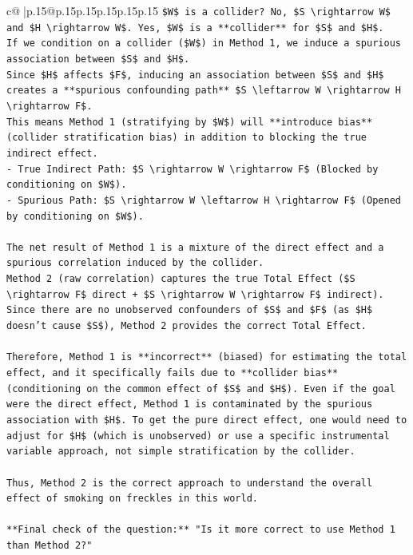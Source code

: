 \documentclass{article}
\begin{document}
{\begin{supertabular}{c@{$\;$}|p{.15\linewidth}@{}p{.15\linewidth}p{.15\linewidth}p{.15\linewidth}p{.15\linewidth}p{.15\linewidth}}
{{{\texttt{\$W\$ is a collider? No, \$S \textbackslash{}rightarrow W\$ and \$H \textbackslash{}rightarrow W\$. Yes, \$W\$ is a **collider** for \$S\$ and \$H\$.} \\
\texttt{If we condition on a collider (\$W\$) in Method 1, we induce a spurious association between \$S\$ and \$H\$.} \\
\texttt{Since \$H\$ affects \$F\$, inducing an association between \$S\$ and \$H\$ creates a **spurious confounding path** \$S \textbackslash{}leftarrow W \textbackslash{}rightarrow H \textbackslash{}rightarrow F\$.} \\
\texttt{This means Method 1 (stratifying by \$W\$) will **introduce bias** (collider stratification bias) in addition to blocking the true indirect effect.} \\
\texttt{{-}   True Indirect Path: \$S \textbackslash{}rightarrow W \textbackslash{}rightarrow F\$ (Blocked by conditioning on \$W\$).} \\
\texttt{{-}   Spurious Path: \$S \textbackslash{}rightarrow W \textbackslash{}leftarrow H \textbackslash{}rightarrow F\$ (Opened by conditioning on \$W\$).} \\
\\ 
\texttt{The net result of Method 1 is a mixture of the direct effect and a spurious correlation induced by the collider.} \\
\texttt{Method 2 (raw correlation) captures the true Total Effect (\$S \textbackslash{}rightarrow F\$ direct + \$S \textbackslash{}rightarrow W \textbackslash{}rightarrow F\$ indirect). Since there are no unobserved confounders of \$S\$ and \$F\$ (as \$H\$ doesn't cause \$S\$), Method 2 provides the correct Total Effect.} \\
\\ 
\texttt{Therefore, Method 1 is **incorrect** (biased) for estimating the total effect, and it specifically fails due to **collider bias** (conditioning on the common effect of \$S\$ and \$H\$). Even if the goal were the direct effect, Method 1 is contaminated by the spurious association with \$H\$. To get the pure direct effect, one would need to adjust for \$H\$ (which is unobserved) or use a specific instrumental variable approach, not simple stratification by the collider.} \\
\\ 
\texttt{Thus, Method 2 is the correct approach to understand the overall effect of smoking on freckles in this world.} \\
\\ 
\texttt{**Final check of the question:** "Is it more correct to use Method 1 than Method 2?"} \\
}}}
\end{supertabular}}
\end{document}
